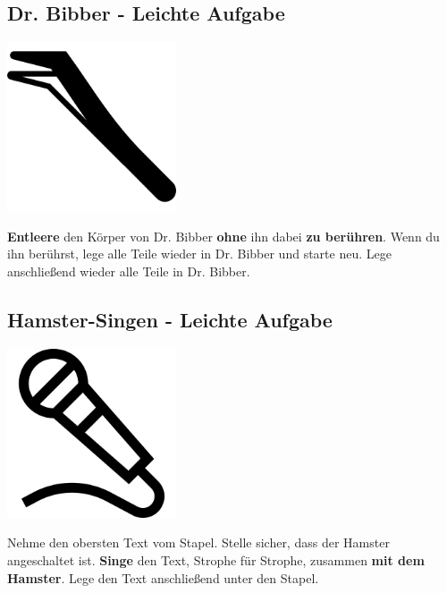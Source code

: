 \subsection{Dr. Bibber - Leichte Aufgabe}
\vfill
\begin{center}
    \includegraphics[height=5cm]{graphics/tweezers.png}
\end{center}
\vfill
\textbf{Entleere} den Körper von Dr. Bibber \textbf{ohne} ihn dabei
\textbf{zu berühren}.
Wenn du ihn berührst, lege alle Teile wieder in Dr. Bibber und starte neu.
Lege anschließend wieder alle Teile in Dr. Bibber.
\newline
\newpage

\subsection{Hamster-Singen - Leichte Aufgabe}
\vfill
\begin{center}
    \includegraphics[height=5cm]{graphics/microfone.png}
\end{center}
\vfill
Nehme den obersten Text vom Stapel.
Stelle sicher, dass der Hamster angeschaltet ist.
\textbf{Singe} den Text, Strophe für Strophe, zusammen \textbf{mit dem Hamster}.
Lege den Text anschließend unter den Stapel.
\newline
\newpage

